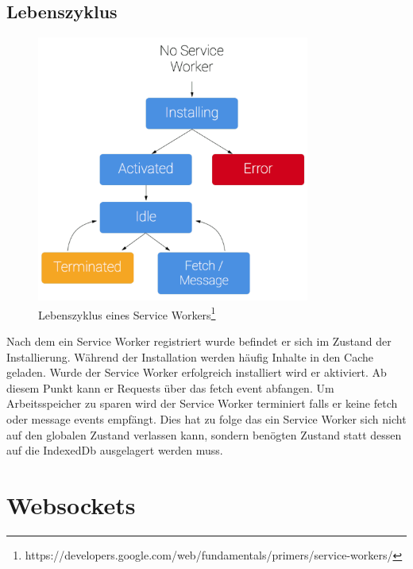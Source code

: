 \subsection{Lebenszyklus}
\begin{figure}[!h]
	\centering
	\includegraphics[width=0.8\textwidth]{figures/sw-lifecycle}
	\caption[A Figure Short-Title]{Lebenszyklus eines Service Workers\footnote{https://developers.google.com/web/fundamentals/primers/service-workers/}}
	\label{fig:swLifecycle}
\end{figure}
Nach dem ein Service Worker registriert wurde befindet er sich im Zustand der Installierung. Während der Installation werden häufig Inhalte in den Cache geladen. Wurde der Service Worker erfolgreich installiert wird er aktiviert. Ab diesem Punkt kann er Requests über das fetch event abfangen. Um Arbeitsspeicher zu sparen wird der Service Worker terminiert falls er keine fetch oder message events empfängt. Dies hat zu folge das ein Service Worker sich nicht auf den globalen Zustand verlassen kann, sondern benögten Zustand statt dessen auf die IndexedDb ausgelagert werden muss.  



%


\section{Websockets}


